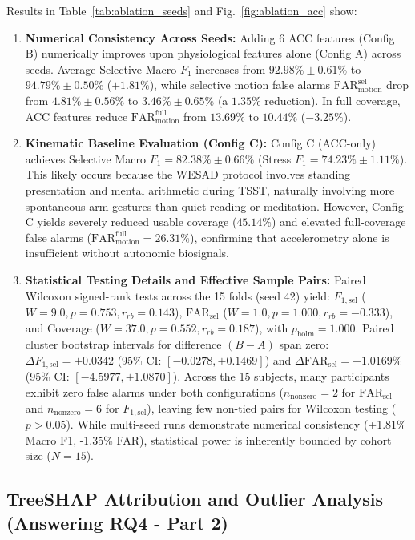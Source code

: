 \documentclass[conference]{IEEEtran}
\begin{document}
Results in Table~\ref{tab:ablation_seeds} and Fig.~\ref{fig:ablation_acc} show:
\begin{enumerate}
    \item \textbf{Numerical Consistency Across Seeds:} Adding 6 ACC features (Config B) numerically improves upon physiological features alone (Config A) across seeds. Average Selective Macro $F_1$ increases from $92.98\% \pm 0.61\%$ to $94.79\% \pm 0.50\%$ ($+1.81\%$), while selective motion false alarms $\text{FAR}_{\text{motion}}^{\text{sel}}$ drop from $4.81\% \pm 0.56\%$ to $3.46\% \pm 0.65\%$ (a $1.35\%$ reduction). In full coverage, ACC features reduce $\text{FAR}_{\text{motion}}^{\text{full}}$ from $13.69\%$ to $10.44\%$ ($-3.25\%$).
    \item \textbf{Kinematic Baseline Evaluation (Config C):} Config C (ACC-only) achieves Selective Macro $F_1 = 82.38\% \pm 0.66\%$ (Stress $F_1 = 74.23\% \pm 1.11\%$). This likely occurs because the WESAD protocol involves standing presentation and mental arithmetic during TSST, naturally involving more spontaneous arm gestures than quiet reading or meditation. However, Config C yields severely reduced usable coverage ($45.14\%$) and elevated full-coverage false alarms ($\text{FAR}_{\text{motion}}^{\text{full}} = 26.31\%$), confirming that accelerometry alone is insufficient without autonomic biosignals.
    \item \textbf{Statistical Testing Details and Effective Sample Pairs:} Paired Wilcoxon signed-rank tests across the 15 folds (seed 42) yield: $F_{1,\text{sel}}$ ($W = 9.0, p = 0.753, r_{rb} = 0.143$), $\text{FAR}_{\text{sel}}$ ($W = 1.0, p = 1.000, r_{rb} = -0.333$), and Coverage ($W = 37.0, p = 0.552, r_{rb} = 0.187$), with $p_{\text{holm}} = 1.000$. Paired cluster bootstrap intervals for difference $(B - A)$ span zero: $\Delta F_{1,\text{sel}} = +0.0342$ (95\% CI: $[-0.0278, +0.1469]$) and $\Delta \text{FAR}_{\text{sel}} = -1.0169\%$ (95\% CI: $[-4.5977, +1.0870]$). Across the 15 subjects, many participants exhibit zero false alarms under both configurations ($n_{\text{nonzero}} = 2$ for $\text{FAR}_{\text{sel}}$ and $n_{\text{nonzero}} = 6$ for $F_{1,\text{sel}}$), leaving few non-tied pairs for Wilcoxon testing ($p > 0.05$). While multi-seed runs demonstrate numerical consistency (+1.81\% Macro F1, -1.35\% FAR), statistical power is inherently bounded by cohort size ($N=15$).
\end{enumerate}

\subsection{TreeSHAP Attribution and Outlier Analysis (Answering RQ4 - Part 2)}
\end{document}
